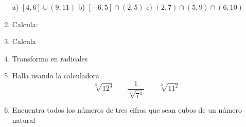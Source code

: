 \documentclass[10pt,twoside]{article}
\begin{document}
\begin{enumerate}
  a) $ [4,6]\cup (9,11)$ \qquad b) $ [-6,5]\cap (2,5) $  \qquad
  c) $ (2,7)\cap (5,9)\cap (6,10) $
  \item Calcula:
  \begin{enumerate}
  \end{enumerate}
  \item Calcula
  \begin{enumerate}
  \end{enumerate}
  \item Transforma en radicales
  \begin{enumerate}
  \end{enumerate}
  \item Halla usando la calculadora
  \[ \sqrt[5]{12^3}\qquad \dfrac{1}{\sqrt[7]{7^4}}\qquad \sqrt[3]{11^2} \]
  \item Encuentra todos los números de tres cifras que sean cubos de un número natural
\end{enumerate}
\end{document}
